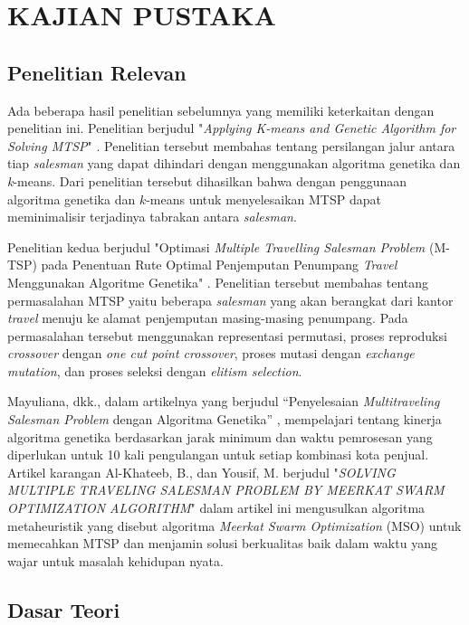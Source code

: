 \chapter{KAJIAN PUSTAKA}

\section{Penelitian Relevan}

Ada beberapa hasil penelitian sebelumnya yang memiliki keterkaitan dengan penelitian ini. Penelitian berjudul "\textit{Applying K-means and Genetic Algorithm for Solving MTSP}" \cite{inproceedings}. Penelitian tersebut membahas tentang persilangan jalur antara tiap \textit{salesman} yang dapat dihindari dengan menggunakan algoritma genetika dan \textit{k}-means. Dari penelitian tersebut dihasilkan bahwa dengan penggunaan algoritma genetika dan $k$-means untuk menyelesaikan MTSP dapat meminimalisir terjadinya tabrakan antara \textit{salesman}.

Penelitian kedua berjudul "Optimasi \textit{Multiple Travelling Salesman Problem} (M-TSP) pada Penentuan Rute Optimal Penjemputan Penumpang \textit{Travel} Menggunakan Algoritme Genetika" \cite{raditya2017optimasi}. Penelitian tersebut membahas tentang permasalahan MTSP yaitu beberapa \textit{salesman} yang akan berangkat dari kantor \textit{travel} menuju ke alamat penjemputan masing-masing penumpang. Pada permasalahan tersebut menggunakan representasi permutasi, proses reproduksi \textit{crossover} dengan \textit{one cut point crossover}, proses mutasi dengan \textit{exchange mutation}, dan proses seleksi dengan \textit{elitism selection}.

Mayuliana, dkk., dalam artikelnya yang berjudul “Penyelesaian \textit{Multitraveling Salesman Problem} dengan Algoritma Genetika” \cite{mayuliana2015penyelesaian}, mempelajari tentang kinerja algoritma genetika berdasarkan jarak minimum dan waktu pemrosesan yang diperlukan untuk 10 kali pengulangan untuk setiap kombinasi kota penjual. Artikel karangan Al-Khateeb, B., dan Yousif, M. berjudul "\textit{SOLVING MULTIPLE TRAVELING SALESMAN PROBLEM BY MEERKAT SWARM OPTIMIZATION ALGORITHM}" \cite{al2019solving} dalam artikel ini mengusulkan algoritma metaheuristik yang disebut algoritma \textit{Meerkat Swarm Optimization} (MSO) untuk memecahkan MTSP dan menjamin solusi berkualitas baik dalam waktu yang wajar untuk masalah kehidupan nyata.

\section{Dasar Teori}

